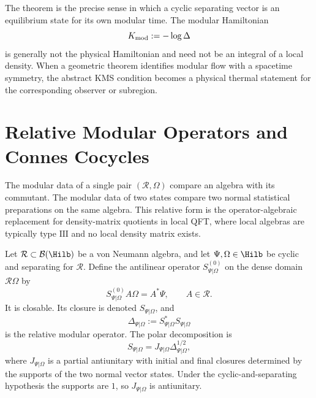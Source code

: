 The theorem is the precise sense in which a cyclic separating vector is an
equilibrium state for its own modular time.  The modular Hamiltonian
\[
  K_{\rm mod}:=-\log\Delta
\]
is generally not the physical Hamiltonian and need not be an integral of a
local density.  When a geometric theorem identifies modular flow with a
spacetime symmetry, the abstract KMS condition becomes a physical thermal
statement for the corresponding observer or subregion.

\section{Relative Modular Operators and Connes Cocycles}
\label{sec:relative-modular-connes-cocycles}

The modular data of a single pair \((\mathcal R,\Omega)\) compare an algebra
with its commutant.  The modular data of two states compare two normal
statistical preparations on the same algebra.  This relative form is the
operator-algebraic replacement for density-matrix quotients in local QFT,
where local algebras are typically type \(\mathrm{III}\) and no local density
matrix exists.

\begin{definition}
\label{def:relative-tomita-operator}
Let \(\mathcal R\subset\mathcal B(\Hilb)\) be a von Neumann algebra, and let
\(\Psi,\Omega\in\Hilb\) be cyclic and separating for \(\mathcal R\).  Define
the antilinear operator \(S_{\Psi|\Omega}^{(0)}\) on the dense domain
\(\mathcal R\Omega\) by
\[
  S_{\Psi|\Omega}^{(0)}A\Omega=A^*\Psi,
  \qquad A\in\mathcal R .
\]
It is closable.  Its closure is denoted \(S_{\Psi|\Omega}\), and
\[
  \Delta_{\Psi|\Omega}:=S_{\Psi|\Omega}^*S_{\Psi|\Omega}
\]
is the relative modular operator.  The polar decomposition is
\[
  S_{\Psi|\Omega}=J_{\Psi|\Omega}\Delta_{\Psi|\Omega}^{1/2},
\]
where \(J_{\Psi|\Omega}\) is a partial antiunitary with initial and final
closures determined by the supports of the two normal vector states.  Under
the cyclic-and-separating hypothesis the supports are \(1\), so
\(J_{\Psi|\Omega}\) is antiunitary.
\end{definition}

